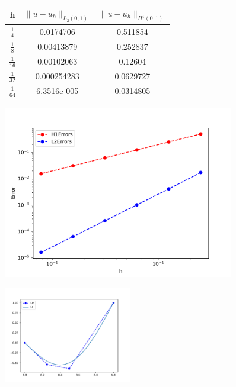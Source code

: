 \documentclass{uonmathreport}
\theoremstyle{definition}
\theoremstyle{problem}
\theoremstyle{theorem}
\begin{document}
\begin{figure}[h!]
\begin{minipage}{0.48\hsize}
\begin{tabular}{ccc}
    \hline
     h & $\|u-u_h\|_{L_2(0,1)}$ & $\|u-u_h\|_{H^1(0,1)}$   \\ \hline
     $\tfrac{1}{4}$ & 0.0174706 &  0.511854   \\
     $\tfrac{1}{8}$ & 0.00413879 &  0.252837   \\
     $\tfrac{1}{16}$ & 0.00102063 &  0.12604   \\
	 $\tfrac{1}{32}$ & 0.000254283 &  0.0629727  \\
     $\tfrac{1}{64}$ & 6.3516e-005 &  0.0314805   \\

    \hline
  \end{tabular}
  \end{minipage}
  \hfill
    \begin{minipage}{0.48\hsize}
  \includegraphics[width=0.9\textwidth]{EllipticPDE2Convergences.pdf}
  \label{fig:c}
\end{minipage}
    \end{figure}


\begin{figure}[h!]
   \includegraphics[width=0.5\textwidth]{EllipticPDE1_hi.pdf}
 \label{fig:eliptic1}
\end{figure}
\end{document}

